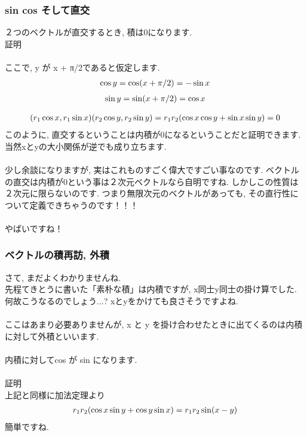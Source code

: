 \documentclass[11pt,a4paper]{jsarticle}
\begin{document}
\subsubsection{sin cos そして直交}
２つのベクトルが直交するとき, 積は0になります.\\
証明\\
\\
ここで, y が x + π/2であると仮定します.\\
\begin{eqnarray}
\cos y = \cos (\mathstrut x + \pi/2) = -\sin x
\end{eqnarray}
\begin{eqnarray}
\sin y = \sin (\mathstrut x + \pi/2) = \cos x
\end{eqnarray}

\begin{eqnarray}
(\mathstrut r_1\cos x, \mathstrut r_1\sin x)(\mathstrut r_2\cos y, \mathstrut r_2\sin y) = \mathstrut r_1\mathstrut r_2(\cos x\cos y + \sin x\sin y) = 0
\end{eqnarray}
このように, 直交するということは内積が0になるということだと証明できます. 当然xとyの大小関係が逆でも成り立ちます.\\
\\
少し余談になりますが, 実はこれものすごく偉大ですごい事なのです. ベクトルの直交は内積が0という事は２次元ベクトルなら自明ですね. しかしこの性質は２次元に限らないのです. つまり無限次元のベクトルがあっても, その直行性について定義できちゃうのです！！！\\
\\
やばいですね！\\


\subsubsection{ベクトルの積再訪, 外積}
さて, まだよくわかりませんね. \\
先程てきとうに書いた「素朴な積」は内積ですが, x同士y同士の掛け算でした.\\
何故こうなるのでしょう...? xとyをかけても良さそうですよね.\\
\\
ここはあまり必要ありませんが, x と y を掛け合わせたときに出てくるのは内積に対して外積といいます.\\
\\
内積に対してcos が sin になります.
\\
\\
証明\\
上記と同様に加法定理より\\
\begin{eqnarray}
\mathstrut r_1\mathstrut r_2(\cos x\sin y + \cos y\sin x) = \mathstrut r_1\mathstrut r_2\sin (x-y)
\end{eqnarray}
簡単ですね.
\end{document}
